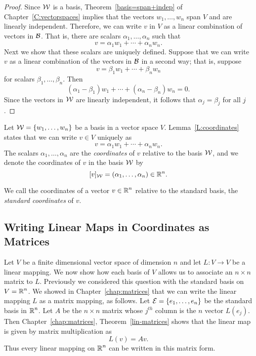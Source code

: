 \documentclass{ximera}
\begin{document}
\begin{proof}  Since ${\cal W}$ is a basis, Theorem~\ref{basis=span+indep} of
Chapter~\ref{C:vectorspaces} implies that the vectors $w_1,\ldots,w_n$ span
$V$ and are linearly independent.  Therefore, we can write $v$ in $V$ as a
linear combination of vectors in ${\cal B}$.   That is, there are scalars
$\alpha_1,\ldots,\alpha_n$ such that
\[
v = \alpha_1w_1 +\cdots + \alpha_nw_n.
\]
Next we show that these scalars are uniquely defined.  Suppose that we can 
write $v$ as a linear combination of the vectors in ${\cal B}$ in a second 
way; that is, suppose 
\[
v = \beta_1w_1 + \cdots + \beta_nw_n
\]
for scalars $\beta_1,\ldots,\beta_n$.  Then
\[
(\alpha_1-\beta_1)w_1 + \cdots + (\alpha_n-\beta_n)w_n = 0.
\]
Since the vectors in ${\cal W}$ are linearly independent, it
follows that $\alpha_j=\beta_j$ for all $j$.  \end{proof}

\begin{Def}  \label{D:coordinates}
Let ${\cal W} = \{w_1,\ldots,w_n\}$ be a basis in a vector space $V$.
Lemma~\ref{L:coordinates} states that we can write $v\in V$ uniquely as
\begin{equation}  \label{e:coordv}
v = \alpha_1w_1 + \cdots + \alpha_nw_n.
\end{equation}
The scalars $\alpha_1,\ldots,\alpha_n$ are the {\em coordinates\/} of $v$
relative to the basis ${\cal W}$, and we denote the coordinates of $v$ in
the basis ${\cal W}$ by
\begin{equation}   \label{e:coordnot}
[v]_{\cal W} = (\alpha_1,\ldots,\alpha_n) \in\mbox{$\Bbb{R}$}^n.
\end{equation}
\end{Def}

We call the coordinates of a vector $v\in\mbox{$\Bbb{R}$}^n$ relative to the standard basis,
the {\em standard coordinates\/} of $v$.

\subsection*{Writing Linear Maps in Coordinates as Matrices}

Let $V$ be a finite dimensional vector space of dimension
$n$ and let
$L:V\to V$ be a linear mapping.
We now show how each basis of $V$ allows
us to associate an $n\times n$ matrix to $L$.  Previously we considered
this question with the standard basis on $V=\mbox{$\Bbb{R}$}^n$. We showed in
Chapter~\ref{chap:matrices} that
we can write the linear mapping $L$ as a
matrix mapping, as
follows.  Let ${\cal E}=\{e_1,\ldots,e_n\}$ be the standard
basis in $\mbox{$\Bbb{R}$}^n$.  Let $A$ be the $n\times n$ matrix whose
$j^{th}$ column is the $n$ vector $L(e_j)$.  Then
Chapter~\ref{chap:matrices}, Theorem~\ref{lin-matrices} shows
that the linear map is given by matrix multiplication as
\[
L(v) = Av.
\]
Thus every linear mapping on $\mbox{$\Bbb{R}$}^n$ can be written in this matrix form.
\end{document}
